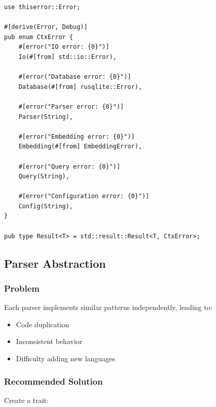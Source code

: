 \begin{lstlisting}[style=rustcode, caption={Unified error type}]
use thiserror::Error;

#[derive(Error, Debug)]
pub enum CtxError {
    #[error("IO error: {0}")]
    Io(#[from] std::io::Error),
    
    #[error("Database error: {0}")]
    Database(#[from] rusqlite::Error),
    
    #[error("Parser error: {0}")]
    Parser(String),
    
    #[error("Embedding error: {0}")]
    Embedding(#[from] EmbeddingError),
    
    #[error("Query error: {0}")]
    Query(String),
    
    #[error("Configuration error: {0}")]
    Config(String),
}

pub type Result<T> = std::result::Result<T, CtxError>;
\end{lstlisting}

\subsection{Parser Abstraction}

\subsubsection{Problem}

Each parser implements similar patterns independently, leading to:
\begin{itemize}
    \item Code duplication
    \item Inconsistent behavior
    \item Difficulty adding new languages
\end{itemize}

\subsubsection{Recommended Solution}

Create a  trait:

